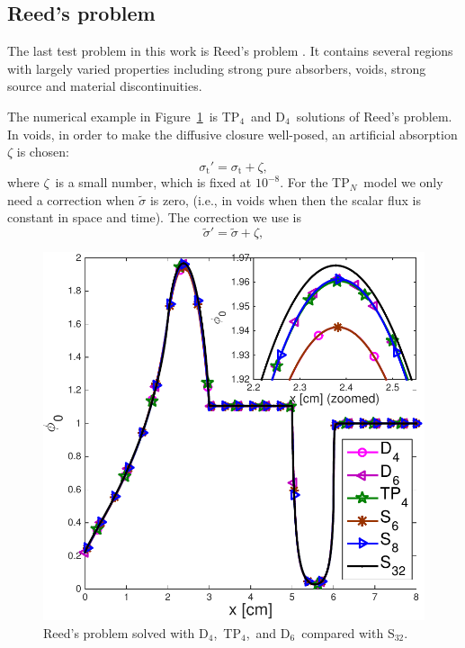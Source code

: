 \documentclass[review]{elsarticle}
\newcommand{\st}{\sigma_\mathrm{t}}
\begin{document}

\subsection{Reed's problem}
The last test problem in this work is  Reed's problem \cite{reed_1971}. It contains several regions with largely varied properties including strong pure absorbers, voids, strong source and material discontinuities.

The numerical example in Figure~\ref{reed2}~is TP$_4$\ and D$_4$\ solutions of Reed's problem. In voids, in order to make the diffusive closure well-posed, an artificial absorption $\zeta$ is chosen:
\begin{equation}
	\st'=\st+\zeta, %
\end{equation}
where $\zeta$~is a small number, which is fixed at $10^{-8}$. For the TP$_N$\ model we only need a correction when $\tilde\sigma$ is zero, (i.e., in voids when then the scalar flux is constant in space and time). The correction we use is
\begin{equation}\label{tp}
\tilde{\sigma}'=\tilde{\sigma}+\zeta, %
\end{equation}

\begin{figure}[ht!]
	\begin{center}
		\includegraphics[width=.5\textwidth]{reed_tp4_d4_d6.pdf}
		\caption[]{Reed's problem solved with D$_4$,\ TP$_4$,\ and D$_6$\ compared with S$_{32}$.}%
		\label{reed2}
	\end{center}
\end{figure}
\end{document}
